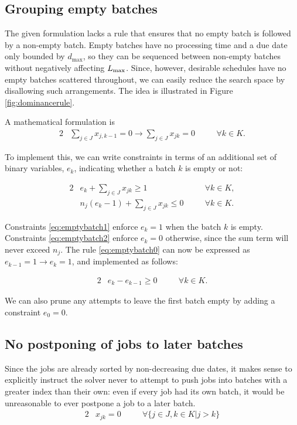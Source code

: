 \subsection{Grouping empty batches} The given
formulation lacks a rule that ensures that no empty batch is followed by a
non-empty batch. Empty batches have no processing time and a due date only
bounded by $d_\text{max}$, so they can be sequenced between non-empty batches
without negatively affecting $L_{\text{max}}$. Since, however, desirable schedules have
no empty batches scattered throughout, we can easily reduce the search space by
disallowing such arrangements. The idea is illustrated in Figure
\ref{fig:dominancerule}.



A mathematical formulation is
\begin{alignat}{2}
& \sum_{j \in J} x_{j,k-1} = 0 \rightarrow \sum_{j \in J} x_{jk} = 0 \quad && \forall k \in K. \label{eq:emptybatch0}
\end{alignat}

To implement this, we can write constraints in terms of an additional  set of binary variables, $e_k$, indicating whether a batch $k$ is empty or not:

\begin{alignat}{2}
& e_k + \sum_{j \in J} x_{jk} \geq 1 \quad && \forall k \in K, \label{eq:emptybatch1} \\
& n_j (e_k-1) + \sum_{j \in J} x_{jk} \leq 0 \quad && \forall k \in K. \label{eq:emptybatch2}
\end{alignat}

Constraints \eqref{eq:emptybatch1} enforce $e_k = 1$ when the batch $k$ is
empty. Constraints \eqref{eq:emptybatch2} enforce $e_k = 0$ otherwise, since the
sum term will never exceed $n_j$. The rule \eqref{eq:emptybatch0} can now be
expressed as $e_{k-1} = 1 \rightarrow e_k = 1$, and implemented as follows:

\begin{alignat}{2}
& e_k - e_{k-1} \geq 0 \quad && \forall k \in K.
\end{alignat}

We can also prune any attempts to leave the first batch empty by adding a constraint $e_0 = 0$.


\subsection{No postponing of jobs to later batches}
Since the jobs are already sorted by non-decreasing due dates, it makes sense to explicitly instruct the solver never to attempt to push jobs into batches with a greater index than their own: even if every job had its own batch, it would be unreasonable to ever postpone a job to a later batch.
\begin{alignat}{2}
  & x_{jk} = 0 \quad && \forall \{j \in J, k \in K | j > k \}
\end{alignat}


